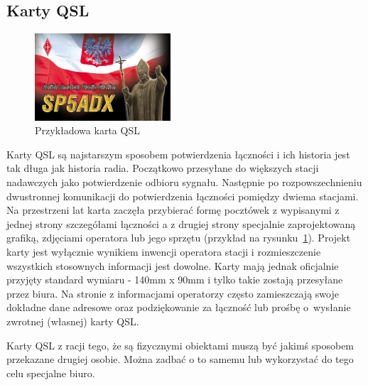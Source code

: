 \documentclass[]{mgr}
\begin{document}
            \subsection{Karty QSL}
            \begin{figure}
                \vspace{-25pt}
                \begin{center}
                    \includegraphics[width=0.45\textwidth]{qsl_card}
                \end{center}
                \vspace{-20pt}
                \caption{Przykładowa karta QSL}
                \vspace{-10pt}
                \label{fig:qsl_card}
            \end{figure}

            Karty QSL są najstarszym sposobem potwierdzenia łączności i ich historia jest tak długa jak historia radia. Początkowo przesyłane do większych stacji nadawczych jako potwierdzenie odbioru sygnału. Następnie po rozpowszechnieniu dwustronnej komunikacji do potwierdzenia łączności pomiędzy dwiema stacjami. Na przestrzeni lat karta zaczęła przybierać formę pocztówek z wypisanymi z jednej strony szczegółami łączności a z drugiej strony specjalnie zaprojektowaną grafiką, zdjęciami operatora lub jego sprzętu (przykład na rysunku~\ref{fig:qsl_card}). Projekt karty jest wyłącznie wynikiem inwencji operatora stacji i rozmieszczenie wszystkich stosownych informacji jest dowolne. Karty mają jednak oficjalnie przyjęty standard wymiaru - 140mm x 90mm i tylko takie zostają przesyłane przez biura. Na stronie z informacjami operatorzy często zamieszczają swoje dokładne dane adresowe oraz podziękowanie za łączność lub prośbę o~wysłanie zwrotnej (własnej) karty QSL.

            Karty QSL z racji tego, że są fizycznymi obiektami muszą być jakimś sposobem przekazane drugiej osobie. Można zadbać o to samemu lub wykorzystać do tego celu specjalne biuro.
\end{document}

